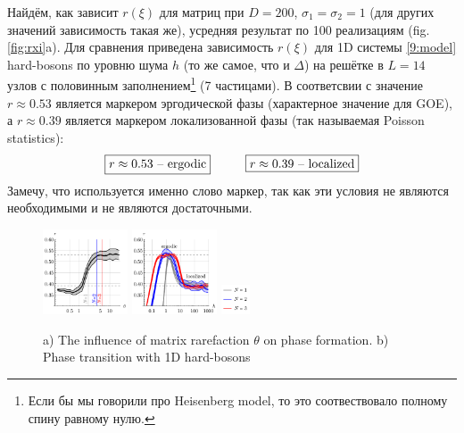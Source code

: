 Найдём, как зависит $r(\xi)$ для матриц при $D=200$, $\sigma_1=\sigma_2=1$ (для других значений зависимость такая же), усредняя результат по 100 реализациям (fig. \ref{fig:rxi}a). Для сравнения приведена зависимость $r(\xi)$ для 1D системы \eqref{9:model} hard-bosons по уровню шума $h$ (то же самое, что и $\Delta$) на решётке в $L=14$ узлов с половинным заполнением\footnote{
    Если бы мы говорили про Heisenberg model, то это соотвествовало полному спину равному нулю. 
} (7 частицами).  В соответсвии с \cite{wei_characterization_2020, pal_many-body_2010} значение $r \approx 0.53$ является маркером эргодической фазы (характерное значение для GOE), а $r \approx 0.39$ является маркером локализованной фазы (так называемая Poisson statistics):
\begin{equation*}
\boxed{
    r \approx 0.53 \text{ -- ergodic}
}
\hspace{10 mm} 
\boxed{
    r \approx 0.39 \text{ -- localized}
}
\end{equation*}
Замечу, что используется именно слово маркер, так как эти условия не являются необходимыми и не являются достаточными. 

\begin{figure}
    \centering
    \includegraphics[align=c, width=0.225\textwidth]{imgs/ergodic_reg.pdf}
    \hspace{10 mm} 
    \includegraphics[align=c, width=0.225\textwidth]{imgs/transition.pdf}
    \hspace{5 mm} 
    \includegraphics[align=c, width=0.075\textwidth]{imgs/transition_leg.pdf}
    \caption{
        a) The influence of matrix rarefaction $\theta$ on phase formation. 
        b) Phase transition with 1D hard-bosons 
    }
    \label{fig:rtheta}
\end{figure}

